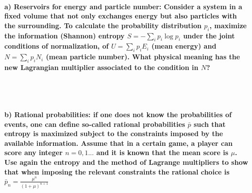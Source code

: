 \paragraph{a) Reservoirs for energy and particle number:
    Consider a system in a fixed volume that not only exchanges energy
    but also particles with the surrounding. To calculate the 
    probability distribution $p_i$, maximize the information 
    (Shannon) entropy $S=-\sum_ip_i\log{p_i}$ under the joint 
    conditions of normalization, of $U=\sum_ip_iE_i$ (mean energy) and 
    $N=\sum_ip_iN_i$ (mean particle number). What physical meaning has 
    the new Lagrangian multiplier associated to the condition in $N$?
} \ \\
\\

\paragraph{b) Rational probabilities: if one does not know the 
    probabilities of events, one can define so-called 
    rational probabilities $\bar{p}$ such that entropy is maximized 
    subject to the constraints imposed by the available information.
    Assume that in a certain game, a player can score any integer 
    $n=0,1...$ and it is known that the mean score is $\mu$. Use again
    the entropy and the method of Lagrange multipliers to show that 
    when imposing the relevant constraints the rational choice is 
    $\bar{p}_n=\frac{\mu^n}{(1+\mu)^{n+1}}$
} \ \\
\\

